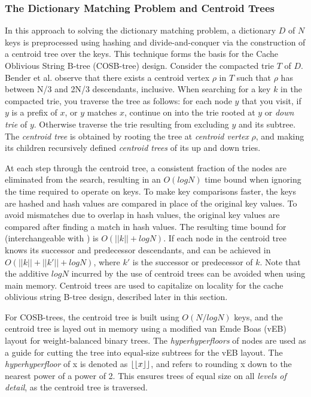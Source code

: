 \documentclass{style}
\begin{document}
\subsubsection{The Dictionary Matching Problem and Centroid Trees} %
In this approach to solving the dictionary matching problem, a dictionary $D$ of $N$ keys is preprocessed using hashing and divide-and-conquer via the construction of a centroid tree over the keys. This technique forms the basis for the Cache Oblivious String B-tree (COSB-tree) design. Consider the compacted trie $T$ of $D$. Bender et al. observe that there exists a centroid vertex $\rho$ in $T$ such that $\rho$ has between N/3 and 2N/3 descendants, inclusive. When searching for a key $k$ in the compacted trie, you traverse the tree as follows: for each node $y$ that you visit, if $y$ is a prefix of $x$, or $y$ matches $x$, continue on into the trie rooted at $y$ or \emph{down trie} of $y$. Otherwise traverse the trie resulting from excluding $y$ and its subtree. The \emph{centroid tree} is obtained by rooting the tree at \emph{centroid vertex} $\rho$, and making its children recursively defined \emph{centroid trees} of its up and down tries. 

At each step through the centroid tree, a consistent fraction of the nodes are eliminated from the search, resulting in an $O(logN)$ time bound when ignoring the time required to operate on keys. To make key comparisons faster, the keys are hashed and hash values are compared in place of the original key values. To avoid mismatches due to overlap in hash values, the original key values are compared after finding a match in hash values. The resulting time bound for \Search{} (interchangeable with \Member{}) is $O(||k||+logN)$. If each node in the centroid tree knows its successor and predecessor descendants, \Pred{} and \Succ{} can be achieved in $O(||k||+||k'||+logN)$, where $k'$ is the successor or predecessor of $k$. Note that the additive $logN$ incurred by the use of centroid trees can be avoided when using main memory. Centroid trees are used to capitalize on locality for the cache oblivious string B-tree design, described later in this section.

For COSB-trees, the centroid tree is built using $O(N/logN)$ keys, and the centroid tree is layed out in memory using a modified van Emde Boas (vEB) layout for weight-balanced binary trees. The \emph{hyperhyperfloors} of nodes are used as a guide for cutting the tree into equal-size subtrees for the vEB layout. The \emph{hyperhyperfloor} of x is denoted as $\lfloor\lfloor{}x\rfloor\rfloor{}$, and refers to rounding x down to the nearest power of a power of 2. This ensures trees of equal size on all \emph{levels of detail}, as the centroid tree is traversed.
\end{document}
